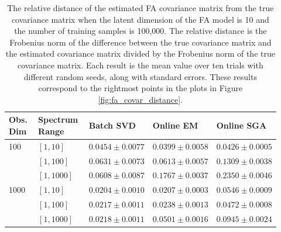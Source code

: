 \documentclass[msc,deptreport.inf]{infthesis} %
\begin{document}
\begin{table}[h!]
	\begin{center}
		\begin{tabular}{|| p{0.12\linewidth} p{0.20\linewidth} p{0.20\linewidth} p{0.20\linewidth} p{0.20\linewidth} ||} 
 			\hline
 			Obs. Dim & Spectrum Range & Batch SVD & Online EM & Online SGA \\ [0.5ex] 
 			\hline\hline
			100 	& $[1, 10]$ 	& $0.0454 \pm 0.0077$ 	& $0.0399 \pm 0.0058$	& $0.0426 \pm 0.0005$ \\ 
				& $[1, 100]$ 	& $0.0631 \pm 0.0073$ 	& $0.0613 \pm 0.0057$ 	& $0.1309 \pm 0.0038$ \\ 
				& $[1, 1000]$	& $0.0608 \pm 0.0087$ 	& $0.1767 \pm 0.0037$ 	& $0.2350 \pm 0.0046$ \\ 
			\hline
			1000	& $[1, 10]$ 	& $0.0204 \pm 0.0010$ 	& $0.0207 \pm 0.0003$ 	& $0.0546 \pm 0.0009$ \\ 
				& $[1, 100]$ 	& $0.0217 \pm 0.0011$ 	& $0.0238 \pm 0.0013$ 	& $0.0472 \pm 0.0008$ \\ 
				& $[1, 1000]$ 	& $0.0218 \pm 0.0011$ 	& $0.0501 \pm 0.0016$ 	& $0.0945 \pm 0.0024$ \\ [1ex] 
			\hline
		\end{tabular}
		\caption{The relative distance of the estimated FA covariance matrix from the true covariance matrix when the latent dimension of the FA model is 10 and the number of training samples is 100,000. The relative distance is the Frobenius norm of the difference between the true covariance matrix and the estimated covariance matrix divided by the Frobenius norm of the true covariance matrix. Each result is the mean value over ten trials with different random seeds, along with standard errors. These results correspond to the rightmost points in the plots in Figure \ref{fig:fa_covar_distance}.}
		\label{table:fa_covar_distance}
	\end{center}
\end{table}
\end{document}
